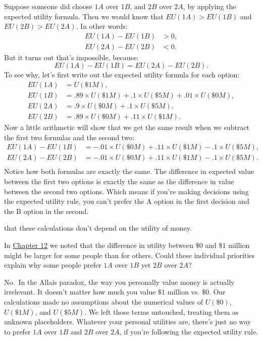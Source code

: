 \documentclass[justified]{tufte-book}
\renewcommand{\u}{U}
\newcommand{\EU}{EU}
\theoremstyle{definition}
\theoremstyle{definition}
\theoremstyle{definition}
\theoremstyle{remark}
\begin{document}
Suppose someone did choose \(1A\) over \(1B\), and \(2B\) over \(2A\),
by applying the expected utility formula. Then we would know that
\(\EU(1A) > \EU(1B)\) and \(\EU(2B) > \EU(2A)\). In other words: \[
  \begin{aligned}
    \EU(1A) - \EU(1B) &> 0,\\
    \EU(2A) - \EU(2B) &< 0.
  \end{aligned}
\] But it turns out that's impossible, because:
\[ \EU(1A) - \EU(1B) = \EU(2A) - \EU(2B). \] To see why, let's first
write out the expected utility formula for each option: \[
  \begin{aligned}
     \EU(1A) &= \u(\$1M),\\
     \EU(1B) &= .89 \times \u(\$1M) + .1 \times \u(\$5M) + .01 \times \u(\$0M),\\
     \EU(2A) &= .9 \times \u(\$0M) + .1 \times\u(\$5M),\\
     \EU(2B) &= .89 \times \u(\$0M) + .11 \times \u(\$1M).
  \end{aligned}
\] Now a little arithmetic will show that we get the same result when we
subtract the first two formulas and the second two: \[
  \begin{aligned}
    \EU(1A) - \EU(1B) &= -.01 \times \u(\$0M) + .11 \times \u(\$1M) - .1 \times \u(\$5M),\\
    \EU(2A) - \EU(2B) &= -.01 \times \u(\$0M) + .11 \times \u(\$1M) - .1 \times \u(\$5M).\\
  \end{aligned}
\] Notice how both formulas are exactly the same. The difference in
expected value between the first two options is exactly the same as the
difference in value between the second two options. Which means if
you're making decisions using the expected utility rule, you can't
prefer the A option in the first decision and the B option in the
second.

 that these calculations don't
depend on the utility of money.

In \protect\hyperlink{utility}{Chapter 12} we noted that the difference
in utility between \(\$0\) and \(\$1\) million might be larger for some
people than for others. Could these individual priorities explain why
some people prefer \(1A\) over \(1B\) yet \(2B\) over \(2A\)?

No.~In the Allais paradox, the way you personally value money is
actually irrelevant. It doesn't matter how much you value \(\$1\)
million vs. \(\$0\). Our calculations made no assumptions about the
numerical values of \(\u(\$0)\), \(\u(\$1M)\), and \(\u(\$5M)\). We left
those terms untouched, treating them as unknown placeholders. Whatever
your personal utilities are, there's just no way to prefer \(1A\) over
\(1B\) and \(2B\) over \(2A\), if you're following the expected utility
rule.
\end{document}

